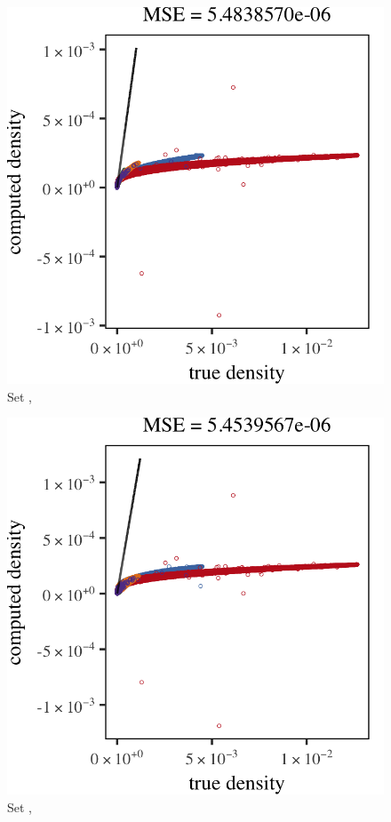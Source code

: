 \begin{subfigure}{0.23\textwidth}
	\centering
	\includegraphics[keepaspectratio=true, width=\textwidth, height=0.23\textheight]{result/img/all/results_ferdosi_3_120000_sambe_silverman}
	\caption{Set \ferdosiThree, \sambe}
	\label{fig:4:simulated:datasets:sambe:ferdosi3}
\end{subfigure}
\begin{subfigure}{0.23\textwidth}
	\centering
	\includegraphics[keepaspectratio=true, width=\textwidth, height=0.23\textheight]{result/img/all/results_baakman_3_120000_sambe_silverman}
	\caption{Set \baakmanThree, \sambe}
	\label{fig:4:results:sambe:baakman3}
\end{subfigure}	